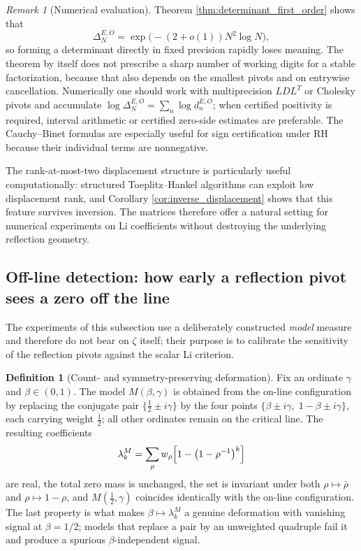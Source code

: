 \documentclass[11pt]{amsart}
\numberwithin{equation}{section}
\theoremstyle{plain}
\theoremstyle{definition}
\newtheorem{definition}[theorem]{Definition}
\theoremstyle{remark}
\newtheorem{remark}[theorem]{Remark}
\newcommand{\RH}{\mathrm{RH}}
\begin{document}
\begin{remark}[Numerical evaluation]
\label{rem:precision_growth}
Theorem \ref{thm:determinant_first_order} shows that
\begin{equation}
\Delta_N^{E,O}=\exp\!\bigl(-(2+o(1))N^2\log N\bigr),
\label{eq:determinant_numerical_scale}
\end{equation}
so forming a determinant directly in fixed precision rapidly loses meaning.  The theorem by itself does not prescribe a sharp number of working digits for a stable factorization, because that also depends on the smallest pivots and on entrywise cancellation.  Numerically one should work with multiprecision $LDL^T$ or Cholesky pivots and accumulate $\log\Delta_N^{E,O}=\sum_n\log d_n^{E,O}$; when certified positivity is required, interval arithmetic or certified zero-side estimates are preferable.  The Cauchy--Binet formulas are especially useful for sign certification under $\RH$ because their individual terms are nonnegative.
\end{remark}

The rank-at-most-two displacement structure is particularly useful computationally: structured Toeplitz--Hankel algorithms can exploit low displacement rank, and Corollary \ref{cor:inverse_displacement} shows that this feature survives inversion. The matrices therefore offer a natural setting for numerical experiments on Li coefficients without destroying the underlying reflection geometry.


\subsection{Off-line detection: how early a reflection pivot sees a zero off the line}
\label{subsec:detection}

The experiments of this subsection use a deliberately constructed \emph{model} measure and
therefore do not bear on $\zeta$ itself; their purpose is to calibrate the sensitivity of
the reflection pivots against the scalar Li criterion.

\begin{definition}[Count- and symmetry-preserving deformation]
\label{def:offline_model}
Fix an ordinate $\gamma$ and $\beta\in(0,1)$.  The model $M(\beta,\gamma)$ is obtained
from the on-line configuration by replacing the conjugate pair
$\{\tfrac12\pm i\gamma\}$ by the four points
$\{\beta\pm i\gamma,\;1-\beta\pm i\gamma\}$, each carrying weight $\tfrac12$; all other
ordinates remain on the critical line.  The resulting coefficients
\begin{equation}
 \lambda_k^{M}
 =\sum_{\rho}w_\rho\Bigl[1-\bigl(1-\rho^{-1}\bigr)^k\Bigr]
 \label{eq:offline_lambda}
\end{equation}
are real, the total zero mass is unchanged, the set is invariant under both
$\rho\mapsto\bar\rho$ and $\rho\mapsto1-\rho$, and $M(\tfrac12,\gamma)$ coincides
identically with the on-line configuration.  The last property is what makes
$\beta\mapsto\lambda_k^M$ a genuine deformation with vanishing signal at $\beta=1/2$;
models that replace a pair by an unweighted quadruple fail it and produce a spurious
$\beta$-independent signal.
\end{definition}
\end{document}
